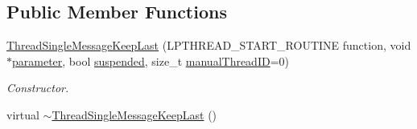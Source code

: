 \subsection*{Public Member Functions}
\begin{DoxyCompactItemize}
\item 
\hyperlink{class_thread_single_message_keep_last_ac5e6299f170af6aaf0e3e581304e9314}{ThreadSingleMessageKeepLast} (LPTHREAD\_\-START\_\-ROUTINE function, void $\ast$\hyperlink{class_thread_single_ad0aa14d604bca6bb1ba5ec5721cd859c}{parameter}, bool \hyperlink{class_thread_single_a710b7388ce616e858f776efab32fbe61}{suspended}, size\_\-t \hyperlink{class_thread_single_a43cc2e11c57294cfcf6f61ef9754f70b}{manualThreadID}=0)
\begin{DoxyCompactList}\small\item\em Constructor. \item\end{DoxyCompactList}\item 
\hypertarget{class_thread_single_message_keep_last_a3bf4e0ee774e4fec20f3fa94d7769fcd}{
virtual \hyperlink{class_thread_single_message_keep_last_a3bf4e0ee774e4fec20f3fa94d7769fcd}{$\sim$ThreadSingleMessageKeepLast} ()}
\label{class_thread_single_message_keep_last_a3bf4e0ee774e4fec20f3fa94d7769fcd}


\end{DoxyCompactItemize}
